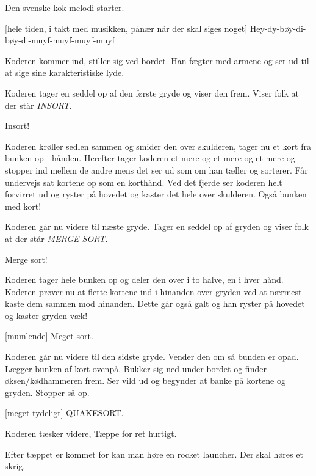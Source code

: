 \documentclass[danish]{article}
\begin{document}
\begin{sketch}

\scene Den svenske kok melodi starter.

[hele tiden, i takt med musikken, pånær når der skal siges
noget] Hey-dy-bøy-di-bøy-di-muyf-muyf-muyf-muyf 

\scene Koderen kommer ind, stiller sig ved bordet. Han fægter med
armene og ser ud til at sige sine karakteristiske lyde.

\scene Koderen tager en seddel op af den første gryde og viser den
frem. Viser folk at der står \emph{INSORT}.

 Insort!

\scene Koderen krøller sedlen sammen og smider den over skulderen,
tager nu et kort fra bunken op i hånden. Herefter tager koderen et
mere og et mere og et mere og stopper ind mellem de andre mens det ser
ud som om han tæller og sorterer. Får undervejs sat kortene op som en
korthånd. Ved det fjerde ser koderen helt forvirret ud og ryster på
hovedet og kaster det hele over skulderen. Også bunken med kort!

\scene Koderen går nu videre til næste gryde. Tager en seddel op af
gryden og viser folk at der står \emph{MERGE SORT}.

 Merge sort!

\scene
Koderen tager hele bunken op og deler
den over i to halve, en i hver hånd. Koderen prøver nu at flette
kortene ind i hinanden over gryden ved at nærmest kaste dem sammen mod
hinanden. Dette går også galt og han ryster på hovedet og kaster gryden
væk!

[mumlende] Meget sort.

\scene Koderen går nu videre til den sidste gryde. Vender den om så
bunden er opad. Lægger bunken af kort ovenpå. Bukker sig ned under
bordet og finder øksen/kødhammeren frem. Ser vild ud og begynder at
banke på kortene og gryden. Stopper så op.

[meget tydeligt] QUAKESORT.

\scene Koderen tæsker videre, Tæppe for ret hurtigt.
 
\scene Efter tæppet er kommet for kan man høre en rocket launcher. Der
skal høres et skrig.

\end{sketch}
\end{document}
